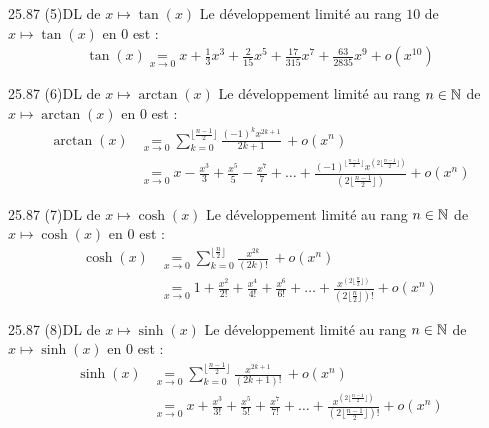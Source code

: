\begin{adjustwidth}{-3cm}{-3cm}
\begin{proposition}{25.87 (5)}{DL de $x \mapsto \tan(x)$}
    Le développement limité au rang $10$ de $x \mapsto \tan(x)$ en $0$ est :
    \begin{align*}
        \tan(x) \underset{x \to 0}{=} x + \frac{1}{3}x^3 + \frac{2}{15}x^5 + \frac{17}{315}x^7 + \frac{63}{2835} x^9+ o(x^{10})
    \end{align*}
\end{proposition}

\begin{proposition}{25.87 (6)}{DL de $x \mapsto \arctan(x)$}
    Le développement limité au rang $n \in \mathbb{N}$ de $x \mapsto \arctan(x)$ en $0$ est :
    \begin{align*}
        \arctan(x) &\underset{x \to 0}{=} \sum_{k=0}^{\lfloor \frac{n-1}{2} \rfloor} \frac{(-1)^{k}x^{2k+1}}{2k+1} \, + o(x^n) \\
        &\underset{x \to 0}{=} x - \frac{x^3}{3} + \frac{x^5}{5} - \frac{x^7}{7} + \dots + \frac{(-1)^{\lfloor \frac{n-1}{2}\rfloor} x^{(2\lfloor\frac{n-1}{2}\rfloor)}}{(2\lfloor\frac{n-1}{2}\rfloor)} + o(x^n)
    \end{align*}
\end{proposition}

\begin{proposition}{25.87 (7)}{DL de $x \mapsto \cosh(x)$}
    Le développement limité au rang $n \in \mathbb{N}$ de $x \mapsto \cosh(x)$ en $0$ est :
    \begin{align*}
        \cosh(x) &\underset{x \to 0}{=} \sum_{k=0}^{\lfloor \frac{n}{2} \rfloor} \frac{x^{2k}}{(2k)!} \, + o(x^n) \\
        &\underset{x \to 0}{=} 1 + \frac{x^2}{2!} + \frac{x^4}{4!} + \frac{x^6}{6!} + \dots + \frac{x^{(2\lfloor\frac{n}{2}\rfloor)}}{(2\lfloor\frac{n}{2}\rfloor)!} + o(x^n)
    \end{align*}
\end{proposition}

\begin{proposition}{25.87 (8)}{DL de $x \mapsto \sinh(x)$}
    Le développement limité au rang $n \in \mathbb{N}$ de $x \mapsto \sinh(x)$ en $0$ est :
    \begin{align*}
        \sinh(x) &\underset{x \to 0}{=} \sum_{k=0}^{\lfloor \frac{n-1}{2} \rfloor} \frac{x^{2k+1}}{(2k+1)!} \, + o(x^n) \\
        &\underset{x \to 0}{=} x + \frac{x^3}{3!} + \frac{x^5}{5!} + \frac{x^7}{7!} + \dots + \frac{x^{(2\lfloor\frac{n-1}{2}\rfloor)}}{(2\lfloor\frac{n-1}{2}\rfloor)!} + o(x^n)
    \end{align*}
\end{proposition}


\end{adjustwidth}
